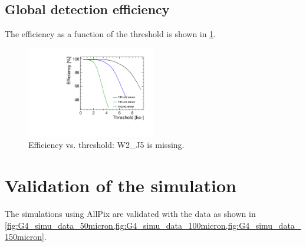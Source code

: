 \subsection{Global detection efficiency}

The efficiency as a function of the threshold is shown in \cref{fig:efficiency_VS_Threshold}.

\begin{figure}[htbp] 
  \centering
  \includegraphics[width=0.5\textwidth]{./figures/TestBeam/Efficiency_vs_THL.pdf}
  \caption{Efficiency vs. threshold: W2\_J5 is missing.}
  \label{fig:efficiency_VS_Threshold}
\end{figure}


\section{Validation of the simulation}

The simulations using AllPix are validated with the data as shown in
\cref{fig:G4_simu_data_50micron,fig:G4_simu_data_100micron,fig:G4_simu_data_150micron}.

